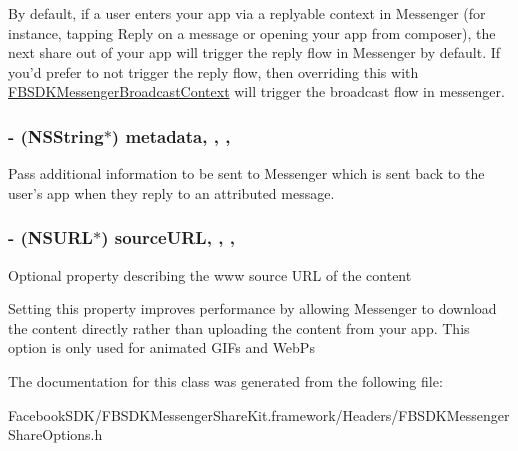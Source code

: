 By default, if a user enters your app via a replyable context in Messenger (for instance, tapping Reply on a message or opening your app from composer), the next share out of your app will trigger the reply flow in Messenger by default. If you'd prefer to not trigger the reply flow, then overriding this with \hyperlink{interface_f_b_s_d_k_messenger_broadcast_context}{F\-B\-S\-D\-K\-Messenger\-Broadcast\-Context} will trigger the broadcast flow in messenger. \hypertarget{interface_f_b_s_d_k_messenger_share_options_a1c26e89d9a84686394c45bafc2fbf91e}{
\subsubsection[{metadata}]{\setlength{\rightskip}{0pt plus 5cm}-\/ (N\-S\-String$\ast$) metadata\hspace{0.3cm}{\ttfamily [read]}, {\ttfamily [write]}, {\ttfamily [nonatomic]}, {\ttfamily [copy]}}}\label{interface_f_b_s_d_k_messenger_share_options_a1c26e89d9a84686394c45bafc2fbf91e}
Pass additional information to be sent to Messenger which is sent back to the user's app when they reply to an attributed message. \hypertarget{interface_f_b_s_d_k_messenger_share_options_ab571f0b042b3da2b02458b6861a8274e}{
\subsubsection[{source\-U\-R\-L}]{\setlength{\rightskip}{0pt plus 5cm}-\/ (N\-S\-U\-R\-L$\ast$) source\-U\-R\-L\hspace{0.3cm}{\ttfamily [read]}, {\ttfamily [write]}, {\ttfamily [nonatomic]}, {\ttfamily [copy]}}}\label{interface_f_b_s_d_k_messenger_share_options_ab571f0b042b3da2b02458b6861a8274e}
Optional property describing the www source U\-R\-L of the content

Setting this property improves performance by allowing Messenger to download the content directly rather than uploading the content from your app. This option is only used for animated G\-I\-Fs and Web\-Ps 

The documentation for this class was generated from the following file\-:\begin{DoxyCompactItemize}
\item 
Facebook\-S\-D\-K/\-F\-B\-S\-D\-K\-Messenger\-Share\-Kit.\-framework/\-Headers/F\-B\-S\-D\-K\-Messenger\-Share\-Options.\-h\end{DoxyCompactItemize}
